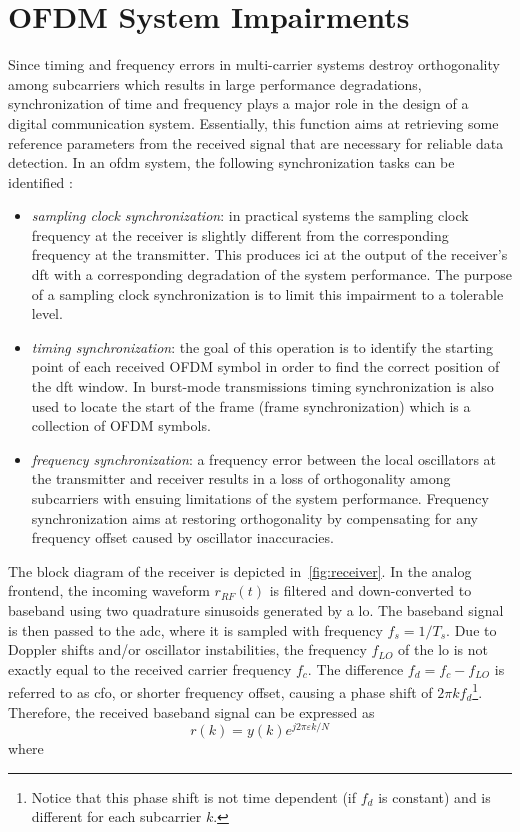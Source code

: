 \section{OFDM System Impairments}\label{sec:sysimp}
Since timing and frequency errors in multi-carrier systems destroy orthogonality among subcarriers which results in large performance degradations, synchronization of time and frequency plays a major role in the design of a digital communication system. Essentially, this function aims at retrieving some reference parameters from the received signal that are necessary for reliable data detection. In an \gls{ofdm} system, the following synchronization tasks can be identified \cite{MCMorelli}:
\begin{itemize}
 \item \textit{sampling clock synchronization}: in practical systems the sampling clock frequency at the receiver is slightly different from the corresponding frequency at the transmitter. This produces \gls{ici} at the output of the receiver's \gls{dft} with a corresponding degradation of the system performance. The purpose of a sampling clock synchronization is to limit this impairment to a tolerable level.
\item \textit{timing synchronization}: the goal of this operation is to identify the starting point of each received OFDM symbol in order to find the correct position of the \gls{dft} window. In burst-mode transmissions timing synchronization is also used to locate the start of the frame (frame synchronization) which is a collection of OFDM symbols.
\item \textit{frequency synchronization}: a frequency error between the local oscillators at the transmitter and receiver results in a loss of orthogonality among subcarriers with ensuing limitations of the system performance. Frequency synchronization aims at restoring orthogonality by compensating for any frequency offset caused by oscillator inaccuracies.
\end{itemize}

The block diagram of the receiver is depicted in~\cref{fig:receiver}. In the analog frontend, the incoming waveform $r_{RF}(t)$ is filtered and down-converted to baseband using two quadrature sinusoids generated by a \gls{lo}. The baseband signal is then passed to the \gls{adc}, where it is sampled with frequency $f_s = 1/T_s$. Due to Doppler shifts and/or oscillator instabilities, the frequency $f_{LO}$ of the \gls{lo} is not exactly equal to the received carrier frequency $f_c$. The difference $f_d = f_c - f_{LO}$ is referred to as \gls{cfo}, or shorter frequency offset, causing a phase shift of $2\pi kf_d$\footnote{Notice that this phase shift is not time dependent (if $f_d$ is constant) and is different for each subcarrier $k$.}. Therefore, the received baseband signal can be expressed as
%
\begin{equation}
\label{eqn:received_time_freqshift}
r(k) =y(k)e^{j2\pi \varepsilon k/N} 
\end{equation}
%
where

